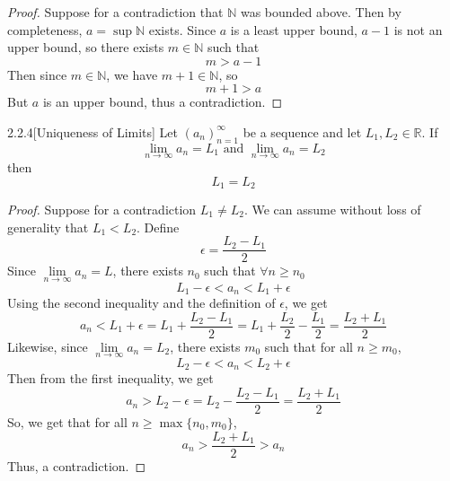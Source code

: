 \documentclass[openany]{report}
\begin{document}
    \begin{proof}
    Suppose for a contradiction that $\mathbb{N}$ was bounded above. Then by completeness, $a = \sup \mathbb{N}$ exists. Since $a$ is a least upper bound, $a - 1$ is not an upper bound, so there exists $m \in \mathbb{N}$ such that 
    \[m > a - 1\]
    Then since $m \in \mathbb{N}$, we have $m + 1 \in \mathbb{N}$, so 
    \[m + 1 > a\]
    But $a$ is an upper bound, thus a contradiction. 
    \end{proof}


    \begin{manualprop}{2.2.4}[Uniqueness of Limits]
        Let $(a_n)_{n=1}^\infty$ be a sequence and let $L_1, L_2 \in \mathbb{R}$. If 
        \[\lim_{n\rightarrow\infty} a_n = L_1 \text{ and } \lim_{n\rightarrow\infty} a_n = L_2\]
        then 
        \[L_1 = L_2\]
    \end{manualprop}
    \begin{proof}
            Suppose for a contradiction $L_1 \neq L_2$. We can assume without loss of generality that $L_1 < L_2$. Define 
            \[\epsilon = \frac{L_2 - L_1}{2}\]
            Since $\lim\limits_{n\rightarrow\infty} a_n = L$, there exists $n_0$ such that $\forall n \geq n_0$
            \[L_1 - \epsilon < a_n < L_1 + \epsilon\]
            Using the second inequality and the definition of $\epsilon$, we get
            \[a_n < L_1 + \epsilon = L_1 + \frac{L_2 - L_1}{2} = L_1 + \frac{L_2}{2} - \frac{L_1}{2} = \frac{L_2 + L_1}{2}\]
            Likewise, since $\lim\limits_{n\rightarrow\infty} a_n = L_2$, there exists $m_0$ such that for all $n \geq m_0$, 
            \[L_2 - \epsilon < a_n < L_2 + \epsilon\]
            Then from the first inequality, we get
            \[a_n > L_2 - \epsilon = L_2 - \frac{L_2 - L_1}{2} = \frac{L_2 + L_1}{2}\]
            So, we get that for all $n \geq \max\{n_0, m_0\}$, 
            \[a_n > \frac{L_2 + L_1}{2} > a_n\]
            Thus, a contradiction.
    \end{proof}
\end{document}
